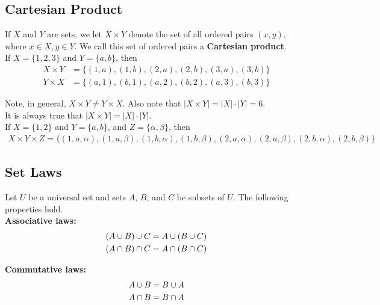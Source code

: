 \subsection*{Cartesian Product}

If $X$ and $Y$ are sets, we let $X \times Y$ denote the set of all ordered pairs $(x, y)$, where $x \in X, y \in Y$.  We call this set of ordered pairs a \textbf{Cartesian product}.\\

If $X = \{1, 2, 3\}$ and $Y = \{a, b\}$, then
\begin{align*}
X \times Y &= \{(1, a), (1, b), (2, a), (2, b), (3, a), (3, b)\}\\
Y \times X &= \{(a, 1), (b, 1), (a, 2), (b, 2), (a, 3), (b, 3)\}
\end{align*}

Note, in general, $X \times Y \neq Y \times X$.  Also note that $|X \times Y| = |X| \cdot |Y| = 6$.\\
It is always true that $|X \times Y| = |X| \cdot |Y|$.\\

If $X = \{1, 2\}$ and $Y = \{a, b\}$, and $Z = \{\alpha, \beta\}$, then
\begin{align*}
    X \times Y \times Z = \{(1, a, \alpha), (1, a, \beta), (1, b, \alpha), (1, b, \beta), (2, a, \alpha), (2, a, \beta), (2, b, \alpha), (2, b, \beta)\}
\end{align*}

\subsection*{Set Laws}

Let $U$ be a universal set and sets $A$, $B$, and $C$ be subsets of $U$.  The following properties hold.\\

\textbf{Associative laws:}
\begin{align*}
    (A \cup B) \cup C &= A \cup (B \cup C)\\
    (A \cap B) \cap C &= A \cap (B \cap C)
\end{align*}

\textbf{Commutative laws:}
\begin{align*}
    A \cup B &= B \cup A\\
    A \cap B &= B \cap A
\end{align*}

